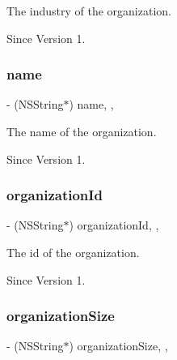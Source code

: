 The industry of the organization. 

\begin{DoxySince}{Since}
Version 1. 
\end{DoxySince}
\hypertarget{class_x_i_organization_info_aead700b0aa4d8e2f3d6cc905300c8310}{}\label{class_x_i_organization_info_aead700b0aa4d8e2f3d6cc905300c8310} 
\subsubsection{\texorpdfstring{name}{name}}
{\footnotesize\ttfamily -\/ (N\+S\+String$\ast$) name\hspace{0.3cm}{\ttfamily [read]}, {\ttfamily [nonatomic]}, {\ttfamily [assign]}}



The name of the organization. 

\begin{DoxySince}{Since}
Version 1. 
\end{DoxySince}
\hypertarget{class_x_i_organization_info_a9d9bb0499f373b9ee0233a68f2fa7e12}{}\label{class_x_i_organization_info_a9d9bb0499f373b9ee0233a68f2fa7e12} 
\subsubsection{\texorpdfstring{organization\+Id}{organizationId}}
{\footnotesize\ttfamily -\/ (N\+S\+String$\ast$) organization\+Id\hspace{0.3cm}{\ttfamily [read]}, {\ttfamily [nonatomic]}, {\ttfamily [assign]}}



The id of the organization. 

\begin{DoxySince}{Since}
Version 1. 
\end{DoxySince}
\hypertarget{class_x_i_organization_info_aa9bfde1242f6e6699622347f6037dfa5}{}\label{class_x_i_organization_info_aa9bfde1242f6e6699622347f6037dfa5} 
\subsubsection{\texorpdfstring{organization\+Size}{organizationSize}}
{\footnotesize\ttfamily -\/ (N\+S\+String$\ast$) organization\+Size\hspace{0.3cm}{\ttfamily [read]}, {\ttfamily [nonatomic]}, {\ttfamily [assign]}}



